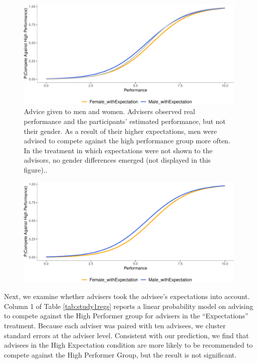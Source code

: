 \documentclass[
  man,floatsintext]{apa6}
\begin{document}
\begin{figure}

{\centering \includegraphics{Advice-Giving_files/figure-latex/study1genderdiff-1} 

}

\caption{Advice given to men and women. Advisers observed real performance and the participants’ estimated performance, but not their gender. As a result of their higher expectations, men were advised to compete against the high performance group more often. In the treatment in which expectations were not shown to the advisors, no gender differences emerged (not displayed in this figure)..}\label{fig:study1genderdiff}
\end{figure}

\begin{figure}

{\centering \includegraphics{Advice-Giving_files/figure-latex/unnamed-chunk-3-1} 

}

\caption{ }\label{fig:unnamed-chunk-3}
\end{figure}

Next, we examine whether advisers took the advisee's expectations into account. Column 1 of Table \ref{tab:study1regs} reports a linear probability model on advising to compete against the High Performer group for advisers in the ``Expectations'' treatment. Because each adviser was paired with ten advisees, we cluster standard errors at the adviser level. Consistent with our prediction, we find that advisees in the High Expectation condition are more likely to be recommended to compete against the High Performer Group, but the result is not significant.
\end{document}

